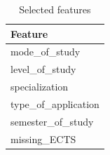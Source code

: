 \begin{table}
    \centering
    \caption{Selected features}
    \label{tab:selected_features}
    \begin{tabular}{l}
        \hline
        \textbf{Feature}\\
        \hline
        mode\_of\_study\\
        level\_of\_study\\
        specialization\\
        type\_of\_application\\
        semester\_of\_study\\
        missing\_ECTS\\
        \hline
    \end{tabular}
\end{table}
